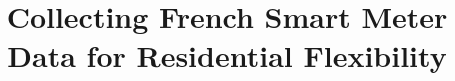 \documentclass[conference]{IEEEtran}
\begin{document}
	
	\title{Collecting French Smart Meter Data for Residential Flexibility %
	}
		
\end{document}
